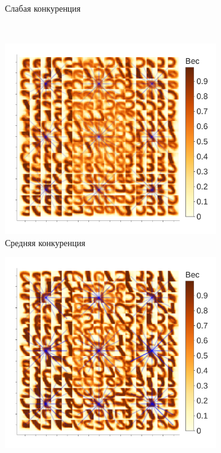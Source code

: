 \documentclass[a4paper]{article}
\begin{document}
\begin{figure}
\begin{subfigure}{0.45\textwidth}
    \caption{Слабая конкуренция}
    \label{fig:medium_bad_competition_distribution}
\end{subfigure}
\\
\begin{subfigure}{0.45\textwidth}
    \includegraphics[width=\textwidth,keepaspectratio=true]{competition_on_XY_medium_good_ru.pdf}
    \caption{Средняя конкуренция}
    \label{fig:medium_good_competition_distribution}
\end{subfigure}
\begin{subfigure}{0.45\textwidth} 
    \includegraphics[width=\textwidth,keepaspectratio=true]{competition_on_XY_best_ru.pdf}

\end{subfigure}
\end{figure}
\end{document}
